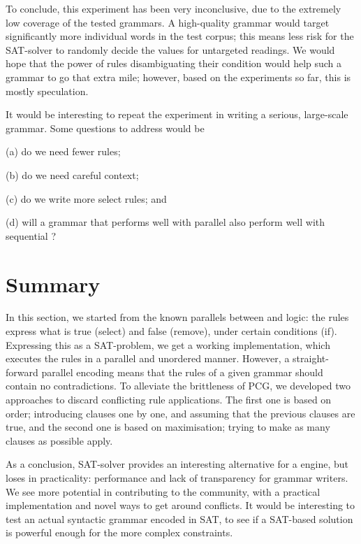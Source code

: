To conclude, this experiment has been very inconclusive, due to the extremely
low coverage of the tested grammars. A high-quality grammar would target
significantly more individual words in the test corpus; this means less risk for
the SAT-solver to randomly decide the values for untargeted readings. We would
hope that the power of rules disambiguating their condition would help such a
grammar to go that extra mile; however, based on the experiments so far, this is
mostly speculation.

It would be interesting to repeat the experiment in writing a serious, large-scale grammar.
Some questions to address would be
\begin{inparaenum}
\item[(a)] do we need fewer rules;
\item[(b)] do we need careful context;
\item[(c)] do we write more {\sc select} rules; and
\item[(d)] will a grammar that performs well with parallel \onlycg{} also perform well with sequential \onlycg{}?
\end{inparaenum}

\section{Summary}

In this section, we started from the known parallels between \onlycg{} and logic:
the rules express what is true ({\sc select}) and false ({\sc remove}), under certain conditions ({\sc if}).
Expressing this as a SAT-problem, we get a working \onlycg{} implementation, which executes the rules in a parallel and unordered manner.
However, a straight-forward parallel encoding means that the rules of a given grammar should contain no contradictions.
To alleviate the brittleness of PCG, we developed two approaches to discard conflicting rule applications.
The first one is based on order; introducing clauses one by one, and assuming that the previous clauses are true,
and the second one is based on maximisation; trying to make as many clauses as possible apply.


As a conclusion, SAT-solver provides an interesting alternative for a \onlycg{} engine, but loses in practicality: performance and lack of transparency for grammar writers.
We see more potential in contributing to the \fsig{} community, with a practical implementation and
novel ways to get around conflicts. It would be interesting to test an actual syntactic \fsig{} grammar encoded in SAT, to see if a SAT-based solution is powerful enough for the more complex constraints.
